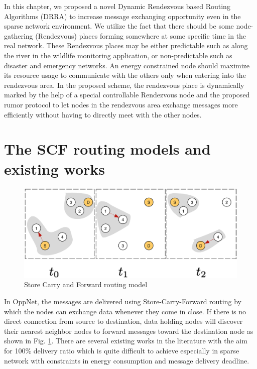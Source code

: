 In this chapter, we proposed a novel Dynamic Rendezvous based Routing Algorithms (DRRA) to increase message exchanging opportunity even in the sparse network environment.
We utilize the fact that there should be some node-gathering (Rendezvous) places forming somewhere at some specific time in the real network.
These Rendezvous places may be either predictable such as along the river in the wildlife monitoring application, or non-predictable such as disaster and emergency networks.
An energy constrained node should maximize its resource usage to communicate with the others only when entering into the rendezvous area.
In the proposed scheme, the rendezvous place is dynamically marked by the help of a special controllable Rendezvous node and the proposed rumor protocol to let nodes in the rendezvous area exchange messages more efficiently without having to directly meet with the other nodes.

\section{The SCF routing models and existing works}
\label{DRRA:The SCF routing models and existing works}

\begin{figure}[!t]
	\centering
	\includegraphics[width=5in]{Figures/SFC.pdf}
	\caption{Store Carry and Forward routing model}
	\label{SFC}
\end{figure}

In OppNet, the messages are delivered using Store-Carry-Forward routing by which  the nodes can exchange data whenever they come in close.
If there is no direct connection from source to destination, data holding nodes will discover their nearest neighbor nodes to forward messages toward the destination node as shown in Fig. \ref{SFC}.
There are several existing works in the literature \cite{Vahdat2000, Harras2005, Neena2013, Lindgren2003,Brendan2005,Boldrini2007,Kerdsri2013} with the aim for 100\% delivery ratio which is quite difficult to achieve especially in sparse network with constraints in energy consumption and message delivery deadline.

